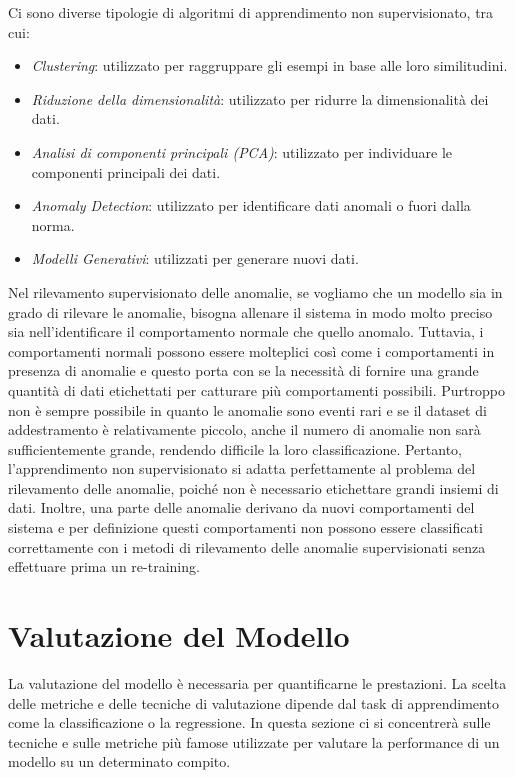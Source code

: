 Ci sono diverse tipologie di algoritmi di apprendimento non supervisionato, tra cui:
\begin{itemize}
\item \textit{Clustering}: utilizzato per raggruppare gli esempi in base alle loro similitudini.
\item \textit{Riduzione della dimensionalità}: utilizzato per ridurre la dimensionalità dei dati.
\item \textit{Analisi di componenti principali (PCA)}: utilizzato per individuare le componenti principali dei dati.
\item \textit{Anomaly Detection}: utilizzato per identificare dati anomali o fuori dalla norma.
\item \textit{Modelli Generativi}: utilizzati per generare nuovi dati.


\end{itemize}
Nel rilevamento supervisionato delle anomalie, se vogliamo che un modello sia in grado di rilevare le anomalie, bisogna allenare il sistema in modo molto preciso sia nell'identificare il comportamento normale che quello anomalo.
Tuttavia, i comportamenti normali possono essere molteplici così come i
comportamenti in presenza di anomalie e questo porta con se la necessità di fornire una grande quantità di dati etichettati per catturare più comportamenti possibili. Purtroppo non è sempre possibile in quanto le anomalie sono eventi rari e se il dataset di addestramento è relativamente piccolo, anche il numero di anomalie non sarà sufficientemente grande, rendendo difficile la loro classificazione. 
Pertanto, l'apprendimento non supervisionato si adatta perfettamente al problema del rilevamento delle anomalie, poiché non è necessario etichettare grandi insiemi di dati. Inoltre, una parte delle anomalie derivano da nuovi comportamenti del sistema e per definizione questi comportamenti non possono essere classificati correttamente con i metodi di rilevamento delle anomalie supervisionati senza effettuare prima un re-training.


\section{Valutazione del Modello}
La valutazione del modello è necessaria per quantificarne le prestazioni. La
scelta delle metriche e delle tecniche di valutazione dipende dal task di apprendimento come la classificazione o la regressione. 
In questa sezione ci si concentrerà sulle tecniche e sulle metriche più famose utilizzate per valutare la performance di un modello su un determinato compito.

